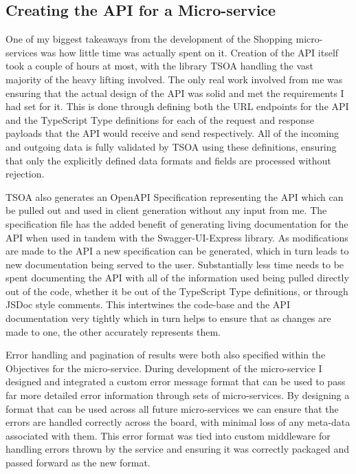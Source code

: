 \subsection{Creating the API for a Micro-service}
One of my biggest takeaways from the development of the Shopping micro-services was how little time was actually spent on it. Creation of the API itself took a couple of hours at most, with the library TSOA handling the vast majority of the heavy lifting involved. The only real work involved from me was ensuring that the actual design of the API was solid and met the requirements I had set for it. This is done through defining both the URL endpoints for the API and the TypeScript Type definitions for each of the request and response payloads that the API would receive and send respectively. All of the incoming and outgoing data is fully validated by TSOA using these definitions, ensuring that only the explicitly defined data formats and fields are processed without rejection.

TSOA also generates an OpenAPI Specification representing the API which can be pulled out and used in client generation without any input from me. The specification file has the added benefit of generating living documentation for the API when used in tandem with the Swagger-UI-Express library. As modifications are made to the API a new specification can be generated, which in turn leads to new documentation being served to the user. Substantially less time needs to be spent documenting the API with all of the information used being pulled directly out of the code, whether it be out of the TypeScript Type definitions, or through JSDoc style comments. This intertwines the code-base and the API documentation very tightly which in turn helps to ensure that as changes are made to one, the other accurately represents them.

Error handling and pagination of results were both also specified within the Objectives for the micro-service. During development of the micro-service I designed and integrated a custom error message format that can be used to pass far more detailed error information through sets of micro-services. By designing a format that can be used across all future micro-services we can ensure that the errors are handled correctly across the board, with minimal loss of any meta-data associated with them. This error format was tied into custom middleware for handling errors thrown by the service and ensuring it was correctly packaged and passed forward as the new format.

